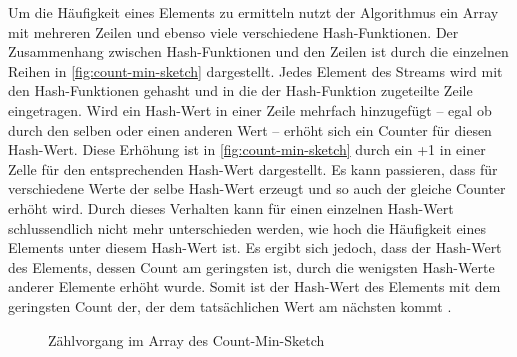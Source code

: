 Um die Häufigkeit eines Elements zu ermitteln 
nutzt der Algorithmus ein Array mit mehreren Zeilen 
und ebenso viele verschiedene Hash-Funktionen.
Der Zusammenhang zwischen Hash-Funktionen und den Zeilen ist durch die einzelnen Reihen in \autoref{fig:count-min-sketch} dargestellt. 
Jedes Element des Streams wird mit den Hash-Funktionen gehasht 
und in die der Hash-Funktion zugeteilte Zeile eingetragen. 
Wird ein Hash-Wert in einer Zeile mehrfach hinzugefügt -- egal ob durch den selben oder einen anderen Wert -- 
erhöht sich ein Counter für diesen Hash-Wert. 
Diese Erhöhung ist in \autoref{fig:count-min-sketch} durch ein +1 in einer Zelle für den entsprechenden Hash-Wert dargestellt.
Es kann passieren, dass für verschiedene Werte der selbe Hash-Wert erzeugt 
und so auch der gleiche Counter erhöht wird.
Durch dieses Verhalten kann für einen einzelnen Hash-Wert 
schlussendlich nicht mehr unterschieden werden, 
wie hoch die Häufigkeit eines Elements unter diesem Hash-Wert ist. 
Es ergibt sich jedoch, dass der Hash-Wert des Elements, dessen Count am geringsten ist, 
durch die wenigsten Hash-Werte anderer Elemente erhöht wurde. 
Somit ist der Hash-Wert des Elements mit dem geringsten Count der, 
der dem tatsächlichen Wert am nächsten kommt \cite{cormode2017}.

\begin{figure}
	\centering
	\caption{Zählvorgang im Array des Count-Min-Sketch}
	\label{fig:count-min-sketch}
\end{figure}

